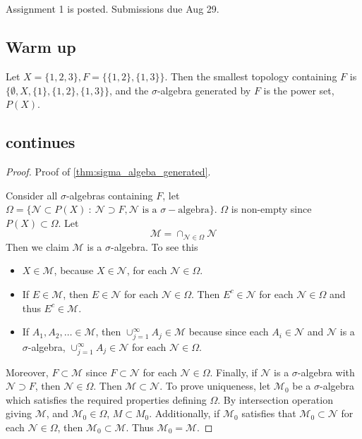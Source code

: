
\chapter{}

Assignment 1 is posted. Submissions due Aug 29.

\section{Warm up}
\begin{example}
  Let $X = \{ 1, 2, 3 \}, F = \{ \{ 1, 2 \}, \{ 1, 3 \} \}$. Then the smallest topology containing $F$ is $\{ \emptyset, X, \{ 1 \}, \{ 1, 2 \}, \{ 1, 3 \} \}$, and the $\sigma$-algebra generated by $F$ is the power set, $P(X)$.
\end{example}
\section{continues}
\begin{proof}
  Proof of \autoref{thm:sigma_algeba_generated}.

  Consider all $\sigma$-algebras containing $F$, let $\Omega = \{ \mathscr{N} \subset P(X) \ : \ \mathscr{N} \supset F, \mathscr{N} \textrm{ is a } \sigma-\textrm{algebra} \}$. $\Omega$  is non-empty since $P(X) \subset \Omega$. Let \[
      \mathscr{M} = \cap_{\mathscr{N} \in  \Omega} \mathscr{N}
  \]
   Then we claim $\mathscr{M}$ is a $\sigma$-algebra. To see this 
   \begin{itemize}
     \item $X \in \mathscr{M}$, because $X \in \mathscr{N}$, for each $\mathscr{N} \in  \Omega$.
     \item If $E \in \mathscr{M}$, then $E \in \mathscr{N}$ for each $\mathscr{N} \in \Omega$. Then $E^c \in \mathscr{N}$ for each $\mathscr{N} \in \Omega$ and thus $E^c \in \mathscr{M}$.
     \item If $A_1, A_2, \ldots \in \mathscr{M}$, then $\cup_{j = 1}^{\infty}A_j \in \mathscr{M}$ because since each $A_i \in \mathscr{N}$ and $\mathscr{N}$ is a $\sigma$-algebra, $\cup_{j = 1}^{\infty}A_j \in \mathscr{N}$ for each $\mathscr{N} \in \Omega$.
   \end{itemize}
  Moreover, $F \subset \mathscr{M}$ since $F \subset \mathscr{N}$ for each $\mathscr{N} \in \Omega$.
  Finally, if $\mathscr{N}$ is a $\sigma$-algebra with $\mathscr{N} \supset F$, then $\mathscr{N} \in \Omega$. Then $\mathscr{M} \subset \mathscr{N}$.
  To prove uniqueness, let $\mathscr{M}_0$ be a $\sigma$-algebra which satisfies the required properties defining $\Omega$. By intersection operation giving $\mathscr{M}$, and $\mathscr{M}_0 \in \Omega$, $M \subset M_0$. Additionally, if $\mathscr{M}_0$ satisfies that $\mathscr{M}_0 \subset \mathscr{N}$ for each $\mathscr{N} \in \Omega$, then $\mathscr{M}_0 \subset \mathscr{M}$. Thus $\mathscr{M}_0 = \mathscr{M}$.
\end{proof}

